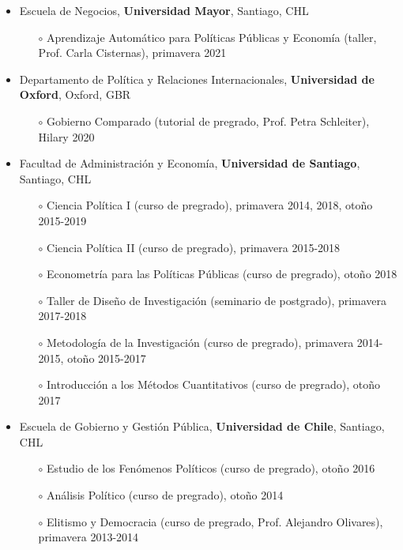 \begin{publications}

\begin{itemize}
\item{\small Escuela de Negocios, {\bfseries Universidad Mayor}, Santiago, CHL}
\begin{itemize}
\item[$\circ$]{\small Aprendizaje Automático para Políticas Públicas y Economía (taller, Prof. Carla Cisternas), primavera 2021}
\end{itemize} 
\item{\small Departamento de Política y Relaciones Internacionales, {\bfseries Universidad de Oxford}, Oxford, GBR}
\begin{itemize}
\item[$\circ$]{\small Gobierno Comparado (tutorial de pregrado, Prof. Petra Schleiter), Hilary 2020}
\end{itemize} 
\item{\small Facultad de Administración y Economía, {\bfseries Universidad de Santiago}, Santiago, CHL}
\begin{itemize}
\item[$\circ$]{\small Ciencia Política I (curso de pregrado), primavera 2014, 2018, otoño 2015-2019}
\item[$\circ$]{\small Ciencia Política II (curso de pregrado), primavera 2015-2018}
\item[$\circ$]{\small Econometría para las Políticas Públicas (curso de pregrado), otoño 2018}
\item[$\circ$]{\small Taller de Diseño de Investigación (seminario de postgrado), primavera 2017-2018}
\item[$\circ$]{\small Metodología de la Investigación (curso de pregrado), primavera 2014-2015, otoño 2015-2017}
\item[$\circ$]{\small Introducción a los Métodos Cuantitativos (curso de pregrado), otoño 2017}
\end{itemize}
\item{\small Escuela de Gobierno y Gestión Pública, {\bfseries Universidad de Chile}, Santiago, CHL}
\begin{itemize}
\item[$\circ$]{\small Estudio de los Fenómenos Políticos (curso de pregrado), otoño 2016}
\item[$\circ$]{\small Análisis Político (curso de pregrado), otoño 2014}
\item[$\circ$]{\small Elitismo y Democracia (curso de pregrado, Prof. Alejandro Olivares), primavera 2013-2014}
\end{itemize}
\end{itemize}

\vspace{1mm}
\end{publications}
 \pagebreak
 